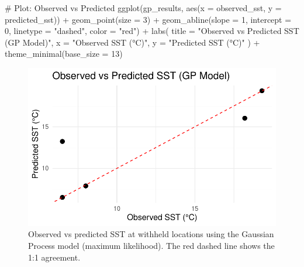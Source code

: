 \documentclass[
  11pt,
]{article}
\newenvironment{Shaded}{\begin{snugshade}}{\end{snugshade}}
\newcommand{\AttributeTok}[1]{\textcolor[rgb]{0.40,0.45,0.13}{#1}}
\newcommand{\CommentTok}[1]{\textcolor[rgb]{0.37,0.37,0.37}{#1}}
\newcommand{\DecValTok}[1]{\textcolor[rgb]{0.68,0.00,0.00}{#1}}
\newcommand{\FunctionTok}[1]{\textcolor[rgb]{0.28,0.35,0.67}{#1}}
\newcommand{\NormalTok}[1]{\textcolor[rgb]{0.00,0.23,0.31}{#1}}
\newcommand{\SpecialCharTok}[1]{\textcolor[rgb]{0.37,0.37,0.37}{#1}}
\newcommand{\StringTok}[1]{\textcolor[rgb]{0.13,0.47,0.30}{#1}}
\begin{document}
\begin{Shaded}
\begin{Highlighting}[]
\CommentTok{\# Plot: Observed vs Predicted}
\FunctionTok{ggplot}\NormalTok{(gp\_results, }\FunctionTok{aes}\NormalTok{(}\AttributeTok{x =}\NormalTok{ observed\_sst, }\AttributeTok{y =}\NormalTok{ predicted\_sst)) }\SpecialCharTok{+}
  \FunctionTok{geom\_point}\NormalTok{(}\AttributeTok{size =} \DecValTok{3}\NormalTok{) }\SpecialCharTok{+}
  \FunctionTok{geom\_abline}\NormalTok{(}\AttributeTok{slope =} \DecValTok{1}\NormalTok{, }\AttributeTok{intercept =} \DecValTok{0}\NormalTok{, }\AttributeTok{linetype =} \StringTok{"dashed"}\NormalTok{, }\AttributeTok{color =} \StringTok{"red"}\NormalTok{) }\SpecialCharTok{+}
  \FunctionTok{labs}\NormalTok{(}
    \AttributeTok{title =} \StringTok{"Observed vs Predicted SST (GP Model)"}\NormalTok{,}
    \AttributeTok{x =} \StringTok{"Observed SST (°C)"}\NormalTok{,}
    \AttributeTok{y =} \StringTok{"Predicted SST (°C)"}
\NormalTok{  ) }\SpecialCharTok{+}
  \FunctionTok{theme\_minimal}\NormalTok{(}\AttributeTok{base\_size =} \DecValTok{13}\NormalTok{)}
\end{Highlighting}
\end{Shaded}

\begin{figure}[H]

{\centering \includegraphics{project_files/figure-pdf/fig-gp_pred_scatter-1.pdf}

}

\caption{Observed vs predicted SST at withheld locations using the
Gaussian Process model (maximum likelihood). The red dashed line shows
the 1:1 agreement.}

\end{figure}%
\end{document}
